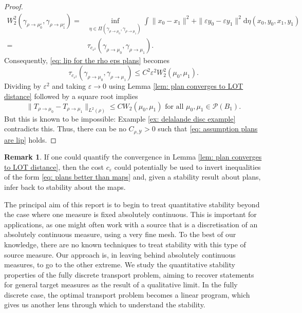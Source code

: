 \documentclass[11pt, oneside, titlepage]{book}
\theoremstyle{plain}
\theoremstyle{definition}
\newtheorem{remark}[theorem]{Remark}
\newcommand{\Y}{\mathcal{Y}}
\newcommand{\di}{\mathrm{d}}
\begin{document}
\begin{proof}
\begin{align*}
         W_2^2(\gamma_{\rho \to \mu_0^\varepsilon}, \gamma_{\rho \to \mu_1^\varepsilon}) =& \inf_{\eta \in \Pi(\gamma_{\rho \to \mu_0}, \gamma_{\rho \to \mu_1})} \int \|x_0 - x_1\|^2 + \|\varepsilon y_0 - \varepsilon y_1 \|^2 \di \eta(x_0, y_0, x_1, y_1)\\
         =& \tau_{c_{\varepsilon^2}}(\gamma_{\rho \to \mu_0}, \gamma_{\rho \to \mu_1}).
    \end{align*}
    Consequently, \eqref{eq: lip for the rho eps plans} becomes
    \begin{equation*}
        \tau_{c_{\varepsilon^2}}(\gamma_{\rho \to \mu_0}, \gamma_{\rho \to \mu_1}) \leq C^2 \varepsilon^2 W_2^2(\mu_0, \mu_1).
    \end{equation*}
    Dividing by $\varepsilon^2$ and taking $\varepsilon \to 0$ using Lemma \ref{lem: plan converges to LOT distance} followed by a square root implies
    \begin{equation*}
        \|T_{\rho \to \mu_0} - T_{\rho \to \mu_1}\|_{L^2(\rho)} \leq C W_2(\mu_0, \mu_1) \text{ for all } \mu_0, \mu_1 \in \mathcal{P}(B_1).
    \end{equation*}
    But this is known to be impossible: Example \ref{ex: delalande disc example} contradicts this. Thus, there can be no $C_{\rho, \Y} >0$ such that \eqref{eq: assumption plans are lip} holds.
\end{proof}
\begin{remark}
     If one could quantify the convergence in Lemma \ref{lem: plan converges to LOT distance}, then the cost $c_\varepsilon$ could potentially be used to invert inequalities of the form \eqref{eq: plans better than maps} and, given a stability result about plans, infer back to stability about the maps.
\end{remark}






The principal aim of this report is to begin to treat quantitative stability beyond the case where one measure is fixed absolutely continuous. This is important for applications, as one might often work with a source that is a discretisation of an absolutely continuous measure, using a very fine mesh. To the best of our knowledge, there are no known techniques to treat stability with this type of source measure. Our approach is, in leaving behind absolutely continuous measures, to go to the other extreme. We study the quantitative stability properties of the fully discrete transport problem, aiming to recover statements for general target measures as the result of a qualitative limit. In the fully discrete case, the optimal transport problem becomes a linear program, which gives us another lens through which to understand the stability.
\end{document}
